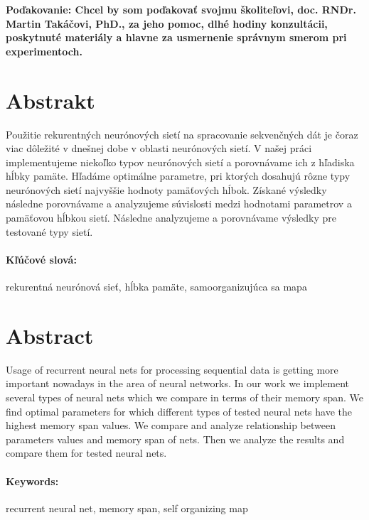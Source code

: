 \documentclass[12pt, oneside]{book}
\begin{document}
 \vfill
 {\bf Poďakovanie: Chcel by som poďakovať svojmu školiteľovi, doc. RNDr. Martin Takáčovi, PhD., za jeho 
 pomoc, dlhé hodiny konzultácii, poskytnuté materiály a hlavne za usmernenie správnym smerom pri experimentoch. }




\newpage 
\section*{Abstrakt}
Použitie rekurentných neurónových sietí na spracovanie
sekvenčných dát je čoraz viac dôležité v dnešnej dobe v oblasti neurónových sietí.
V našej práci implementujeme niekoľko typov neurónových sietí a porovnávame ich z hľadiska hĺbky pamäte.
Hľadáme optimálne parametre, pri ktorých dosahujú rôzne typy neurónových sietí najvyššie hodnoty pamäťových hĺbok.
Získané výsledky následne porovnávame a analyzujeme súvislosti medzi hodnotami parametrov a pamäťovou hĺbkou sietí. 
Následne analyzujeme a porovnávame výsledky pre testované typy sietí.

\paragraph*{Kľúčové slová:} rekurentná neurónová sieť, hĺbka pamäte, samoorganizujúca sa mapa


\newpage 
\section*{Abstract}
Usage of recurrent neural nets for processing sequential data is getting more important nowadays in the area of neural networks.
In our work we implement several types of neural nets which we compare in terms of their memory span.
We find optimal parameters for which different types of tested neural nets have the highest memory span values.
We compare and analyze relationship between parameters values and memory span of nets.
Then we analyze the results and compare them for tested neural nets.

\paragraph*{Keywords:} recurrent neural net, memory span, self organizing map

\end{document}
